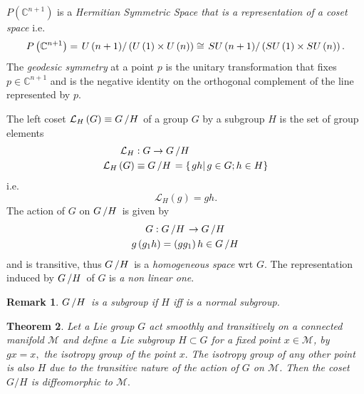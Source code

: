 \documentclass[aps,preprint]{revtex4}%
\newtheorem{theorem}{Theorem}
\newtheorem{remark}[theorem]{Remark}
\begin{document}
$P\left(  \mathbb{C}^{n+1}\right)  $ is a \emph{Hermitian Symmetric Space that
is a representation of a coset space }i.e. \emph{ }
\begin{equation}
P\left(  \mathbb{C}^{n+1}\right)  =\left.  U\left(  n+1\right)  \right/
\left(  U\left(  1\right)  \times U\left(  n\right)  \right)  \cong\left.
SU\left(  n+1\right)  \right/  \left(  SU\left(  1\right)  \times SU\left(
n\right)  \right)  .
\end{equation}
The \emph{geodesic symmetry} at a point $p$ is the unitary transformation that
fixes $p\in\mathbb{C}^{n+1}$ and is the negative identity on the orthogonal
complement of the line represented by $p.$

The left coset $\mathcal{L}_{H}\left(  G\right)  \equiv G\left/  H\right.  $
of a group $G$ by a subgroup $H$ is the set of group elements
\begin{align}
\mathcal{L}_{H}  &  :G\rightarrow G\left/  H\right. \\
\mathcal{L}_{H}\left(  G\right)   &  \equiv G\left/  H\right.  =\left\{
\left.  gh\right\vert g\in G;h\in H\right\}
\end{align}
i.e.
\begin{equation}
\mathcal{L}_{H}\left(  g\right)  =gh.
\end{equation}
The action of $G$ on $G\left/  H\right.  $ is given by
\begin{gather}
G:G\left/  H\right.  \rightarrow G\left/  H\right. \\
g\left(  g_{1}h\right)  =\left(  gg_{1}\right)  h\in G\left/  H\right.
\end{gather}
and is transitive, thus $G\left/  H\right.  $ is a \emph{homogeneous space}
wrt $G.$ The representation induced by $G\left/  H\right.  $ of $G$ is \emph{a
non linear one}.

\begin{remark}
$G\left/  H\right.  $ is a subgroup if $H$ iff is a normal subgroup.
\end{remark}

\begin{theorem}
Let a Lie group $G$ act smoothly and \emph{transitively} on a connected
manifold $\mathcal{M}$ and define a Lie subgroup $H\subset G$ for a fixed
point $x\in\mathcal{M}$, by $gx=x,$ the \emph{isotropy group} of the point
$x.$ The isotropy group of any other point is also $H$ due to the transitive
nature of the action of $G$ on $\mathcal{M}$. Then the coset $G/H$ is
diffeomorphic to $\mathcal{M}.$
\end{theorem}
\end{document}
